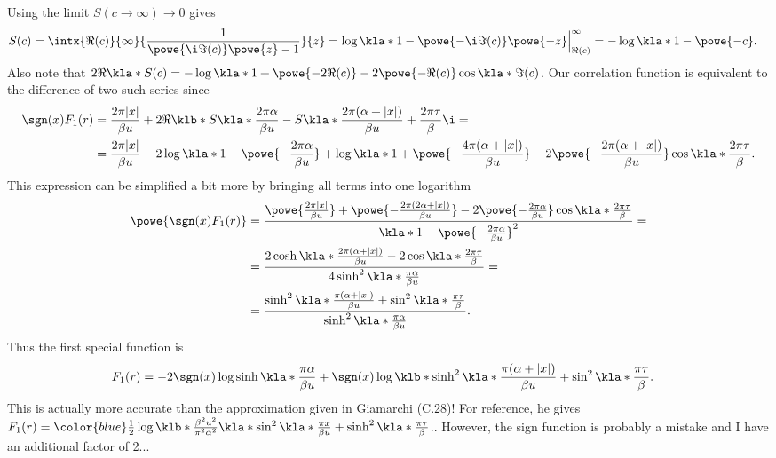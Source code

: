\documentclass[english, parskip=full]{scrartcl}
\newcommand{\TODO}[1]{\color{red!60!black} #1\color{black}}
\newcommand\QnA[1]{\bgroup\color{blue} #1\egroup}
\begin{document}
Using the limit $S(c\rightarrow \infty) \rightarrow 0$ gives
\begin{align}
S(c) &= \intx{\Re(c)}{\infty}{\frac{1}{\powe{\i \Im(c)} \powe{z} - 1}}{z} = \log \kla*{1 - \powe{-\i \Im(c)} \powe{-z}} \Big\vert_{\Re(c)}^\infty = -\log \kla*{1 - \powe{-c}}.
\end{align}
Also note that $2\Re \kla*{S(c)} = -\log \kla*{1 + \powe{-2\Re (c)} - 2\powe{-\Re(c)} \cos\kla*{\Im(c)} } $.
Our correlation function is equivalent to the difference of two such series since
\begin{align}
\sgn(x) F_1(r) &= \frac{2\pi |x|}{\beta u} + 2 \Re \klb*{S\kla*{\frac{2\pi\alpha}{\beta u}} - S\kla*{\frac{2\pi(\alpha + |x|)}{\beta u} + \frac{2\pi \tau}{\beta}\i} } = \\
&= \frac{2\pi |x|}{\beta u} - 2 \log \kla*{1 - \powe{-\frac{2\pi\alpha}{\beta u}}} +  \log \kla*{1 + \powe{-\frac{4\pi (\alpha + |x|)}{\beta u}} - 2\powe{-\frac{2\pi (\alpha + |x|)}{\beta u}} \cos \kla*{\frac{2\pi\tau}{\beta}} }.
\end{align}
This expression can be simplified a bit more by bringing all terms into one logarithm
\begin{align}
\powe{\sgn(x) F_1(r)} &= \frac{\powe{\frac{2\pi |x|}{\beta u}} + \powe{-\frac{2\pi (2\alpha  + |x|)}{\beta u}} - 2 \powe{-\frac{2\pi \alpha}{\beta u}} \cos \kla*{\frac{2\pi\tau}{\beta}} }{\kla*{1 - \powe{-\frac{2\pi\alpha}{\beta u}}}^2} = \\
&= \frac{2\cosh\kla*{\frac{2\pi (\alpha + |x|)}{\beta u}} - 2\cos \kla*{\frac{2\pi\tau}{\beta}} }{4\sinh^2\kla*{\frac{\pi\alpha}{\beta u}} } = \\
&= \frac{\sinh^2 \kla*{\frac{\pi (\alpha + |x|)}{\beta u}} + \sin^2\kla*{\frac{\pi\tau}{\beta}} }{\sinh^2\kla*{\frac{\pi\alpha}{\beta u}} }.
\end{align}
Thus the first special function is
\begin{align}
F_1(r) &= -2\sgn(x) \log \sinh \kla*{\frac{\pi\alpha}{\beta u}} +\sgn(x)  \log \klb*{\sinh^2 \kla*{\frac{\pi (\alpha + |x|)}{\beta u}} + \sin^2\kla*{\frac{\pi\tau}{\beta}}}.
\end{align}
\TODO{This is actually more accurate than the approximation given in Giamarchi (C.28)!
For reference, he gives $F_1(r) = \QnA{\frac{1}{2}} \log \klb*{\frac{\beta^2u^2}{\pi^2\alpha^2} \kla*{\sin^2 \kla*{\frac{\pi x}{\beta u}} + \sinh^2\kla*{\frac{\pi\tau}{\beta}}} } $..
However, the sign function is probably a mistake and I have an additional factor of 2...}\\
\end{document}
